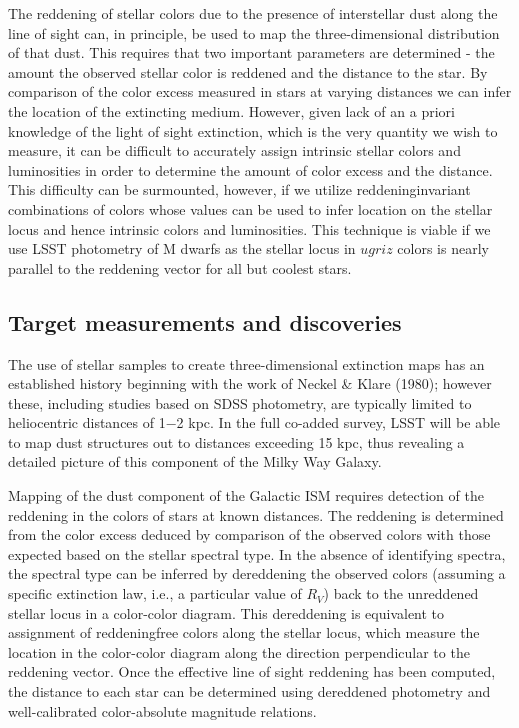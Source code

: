 The reddening of stellar colors due to the presence of interstellar dust along the line of sight can,
in principle, be used to map the three-dimensional distribution of that dust. This requires that
two important parameters are determined - the amount the observed stellar color is reddened and
the distance to the star. By comparison of the color excess measured in stars at varying distances
we can infer the location of the extincting medium. However, given lack of an a priori knowledge
of the light of sight extinction, which is the very quantity we wish to measure, it can be difficult
to accurately assign intrinsic stellar colors and luminosities in order to determine the amount of
color excess and the distance. This difficulty can be surmounted, however, if we utilize reddeninginvariant
combinations of colors whose values can be used to infer location on the stellar locus
and hence intrinsic colors and luminosities. This technique is viable if we use LSST photometry of
M dwarfs as the stellar locus in $ugriz$ colors is nearly parallel to the reddening vector for all but
coolest stars.



\subsection{Target measurements and discoveries}
\label{sec:\secname:targets}

The use of stellar samples to create three-dimensional extinction maps has an established history
beginning with the work of Neckel \& Klare (1980); however these, including studies based on SDSS
photometry, are typically limited to heliocentric distances of 1−2 kpc. In the full co-added survey,
LSST will be able to map dust structures out to distances exceeding 15 kpc, thus revealing a
detailed picture of this component of the Milky Way Galaxy.

Mapping of the dust component of the Galactic ISM requires detection of the reddening in the
colors of stars at known distances. The reddening is determined from the color excess deduced
by comparison of the observed colors with those expected based on the stellar spectral type. In
the absence of identifying spectra, the spectral type can be inferred by dereddening the observed
colors (assuming a specific extinction law, i.e., a particular value of $R_V$) back to the unreddened
stellar locus in a color-color diagram. This dereddening is equivalent to assignment of reddeningfree
colors along the stellar locus, which measure the location in the color-color diagram along
the direction perpendicular to the reddening vector. Once the effective line of sight reddening has
been computed, the distance to each star can be determined using dereddened photometry and
well-calibrated color-absolute magnitude relations.

